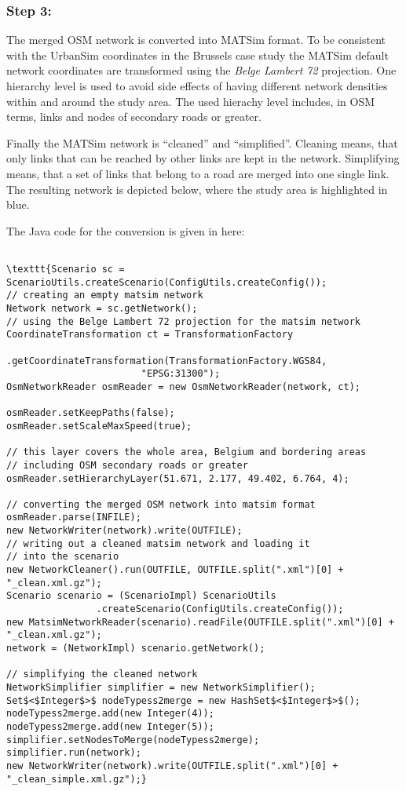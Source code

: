 \documentclass[a4paper,11pt]{report}
\begin{document}
\subsubsection{Step 3:}

The merged OSM network is converted into MATSim format. To be  consistent with the UrbanSim coordinates in the Brussels case study the  MATSim default network coordinates are transformed using the \emph{Belge Lambert 72}  projection. One hierarchy level is used to avoid side effects of having  different network densities within and around the study area. The used  hierachy level includes, in OSM terms, links and nodes of secondary  roads or greater.

Finally the MATSim network is “cleaned” and “simplified”. Cleaning  means, that only links that can be reached by other links are kept in  the network. Simplifying means, that a set of links that belong to a  road are merged into one single link. The resulting network is depicted  below, where the study area is highlighted in blue.

The Java code for the conversion is given in here:
\begin{verbatim}

\texttt{Scenario sc = ScenarioUtils.createScenario(ConfigUtils.createConfig());
// creating an empty matsim network
Network network = sc.getNetwork();
// using the Belge Lambert 72 projection for the matsim network
CoordinateTransformation ct = TransformationFactory
                .getCoordinateTransformation(TransformationFactory.WGS84,
                        "EPSG:31300");
OsmNetworkReader osmReader = new OsmNetworkReader(network, ct);

osmReader.setKeepPaths(false);
osmReader.setScaleMaxSpeed(true);

// this layer covers the whole area, Belgium and bordering areas
// including OSM secondary roads or greater
osmReader.setHierarchyLayer(51.671, 2.177, 49.402, 6.764, 4);

// converting the merged OSM network into matsim format
osmReader.parse(INFILE);
new NetworkWriter(network).write(OUTFILE);
// writing out a cleaned matsim network and loading it
// into the scenario
new NetworkCleaner().run(OUTFILE, OUTFILE.split(".xml")[0] + "_clean.xml.gz");
Scenario scenario = (ScenarioImpl) ScenarioUtils
                .createScenario(ConfigUtils.createConfig());
new MatsimNetworkReader(scenario).readFile(OUTFILE.split(".xml")[0] + "_clean.xml.gz");
network = (NetworkImpl) scenario.getNetwork();

// simplifying the cleaned network
NetworkSimplifier simplifier = new NetworkSimplifier();
Set$<$Integer$>$ nodeTypess2merge = new HashSet$<$Integer$>$();
nodeTypess2merge.add(new Integer(4));
nodeTypess2merge.add(new Integer(5));
simplifier.setNodesToMerge(nodeTypess2merge);
simplifier.run(network);
new NetworkWriter(network).write(OUTFILE.split(".xml")[0] + "_clean_simple.xml.gz");}
\end{verbatim}
\end{document}
